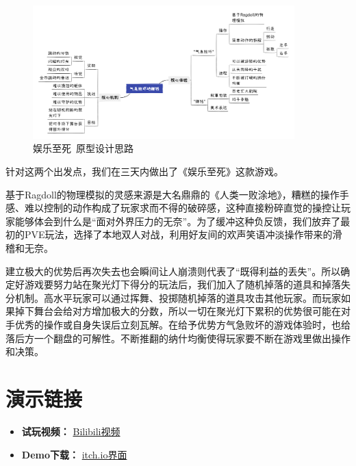 \begin{figure}[H]
    \centering
    \includegraphics[width=0.9\textwidth]{Images/娱乐至死/ylzs_design.png}
    \caption{娱乐至死\ 原型设计思路}
\end{figure}

针对这两个出发点，我们在三天内做出了《娱乐至死》这款游戏。

基于Ragdoll的物理模拟的灵感来源是大名鼎鼎的《人类一败涂地》，糟糕的操作手感、难以控制的动作构成了玩家求而不得的破碎感，这种直接粉碎直觉的操控让玩家能够体会到什么是“面对外界压力的无奈”。为了缓冲这种负反馈，我们放弃了最初的PVE玩法，选择了本地双人对战，利用好友间的欢声笑语冲淡操作带来的滑稽和无奈。

建立极大的优势后再次失去也会瞬间让人崩溃则代表了“既得利益的丢失”。所以确定好游戏要努力站在聚光灯下得分的玩法后，我们加入了随机掉落的道具和掉落失分机制。高水平玩家可以通过挥舞、投掷随机掉落的道具攻击其他玩家。而玩家如果掉下舞台会给对方增加极大的分数，所以一切在聚光灯下累积的优势很可能在对手优秀的操作或自身失误后立刻瓦解。在给予优势方气急败坏的游戏体验时，也给落后方一个翻盘的可解性。不断推翻的纳什均衡使得玩家要不断在游戏里做出操作和决策。

\section{演示链接}
\begin{itemize}
    \item \textbf{试玩视频：}  \href{https://www.bilibili.com/video/BV13M411n7Dp/?vd_source=ead0ac501dfae814e19fd7d9f376d92d}{Bilibili视频}
    \item \textbf{Demo下载：}  \href{https://scyq.itch.io/amusing-ourselves}{itch.io界面} 
\end{itemize}